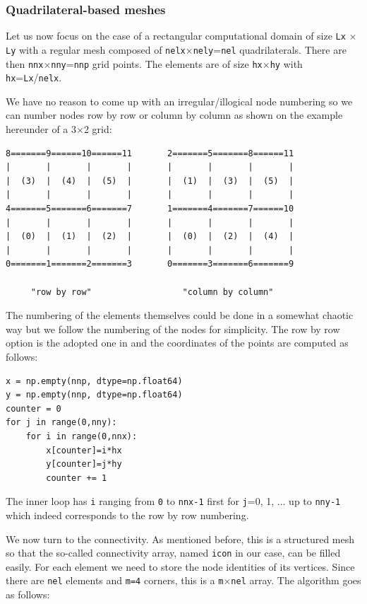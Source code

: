 \subsubsection{Quadrilateral-based meshes}

Let us now focus on the case of a rectangular computational domain of size 
{\tt Lx} $\times$ {\tt Ly} with a regular mesh composed of {\tt nelx}$\times${\tt nely}={\tt nel}
   quadrilaterals.  
There are then {\tt nnx}$\times${\tt nny}={\tt nnp} grid points.
The elements are of size {\tt hx}$\times${\tt hy} with {\tt hx}={\tt Lx}/{\tt nelx}.

We have no reason to come up with an irregular/illogical node numbering so 
we can number nodes row by row or column by column as shown on the example 
hereunder of a 3$\times$2 grid:

\begin{verbatim}
8=======9======10======11       2=======5=======8======11
|       |       |       |       |       |       |       |
|  (3)  |  (4)  |  (5)  |       |  (1)  |  (3)  |  (5)  |
|       |       |       |       |       |       |       |
4=======5=======6=======7       1=======4=======7======10
|       |       |       |       |       |       |       |
|  (0)  |  (1)  |  (2)  |       |  (0)  |  (2)  |  (4)  |
|       |       |       |       |       |       |       |
0=======1=======2=======3       0=======3=======6=======9

     "row by row"                  "column by column"
\end{verbatim}

The numbering of the elements themselves could be done in a somewhat chaotic 
way but we follow the numbering of the nodes for simplicity.
The row by row option is the adopted one in \fieldstone{} and the coordinates of the 
points are computed as follows:

\begin{lstlisting}
x = np.empty(nnp, dtype=np.float64)
y = np.empty(nnp, dtype=np.float64)
counter = 0
for j in range(0,nny):
    for i in range(0,nnx):
        x[counter]=i*hx
        y[counter]=j*hy
        counter += 1
\end{lstlisting}
The inner loop has {\tt i} ranging from {\tt 0} to {\tt nnx-1} first for {\tt j}=0, 1, ...
up to {\tt nny-1} which indeed corresponds to the row by row numbering.

We now turn to the connectivity. As mentioned before, this is a structured mesh so that the so-called
connectivity array, named {\tt icon} in our case, can be filled easily. For each element we need
to store the node identities of its vertices. Since there are {\tt nel} elements and {\tt m=4} corners, 
this is a {\tt m}$\times${\tt nel} array. The algorithm goes as follows:


